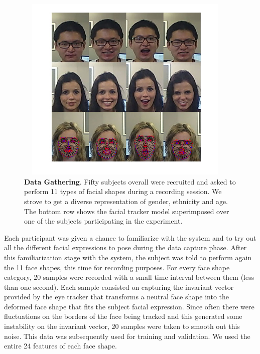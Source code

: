 \documentclass[]{article}
\begin{document}
\begin{figure}[ht]
\begin{center}
\vspace{-3mm}
\includegraphics[width=0.95\textwidth,height=90mm]{figures/dataExtrationExamples.jpg}
\end{center}
\caption{\textbf{Data Gathering}. Fifty subjects overall were recruited and asked to perform 11 types of facial shapes during a 
recording session. We strove to  get a diverse representation of gender, ethnicity and age. The bottom row shows the facial tracker 
model superimposed over one of the subjects participating in the experiment.}
\label{dataExtrationExamples}
\end{figure}


Each participant was given a chance to familiarize with the system and to try out all the different facial expressions
to pose during the data capture phase. After this familiarization stage with the system, the subject was told to perform
again the 11 face shapes, this time for recording purposes. For every face shape category, 20 samples were recorded with
a small time interval between them (less than one second). Each sample consisted on capturing the invariant vector
provided by the eye tracker that transforms a neutral face shape into the deformed face shape that fits the subject
facial expression. Since often there were fluctuations on the borders of the face being tracked and this generated some
instability on the invariant vector, 20 samples were taken to smooth out this noise. This data was subsequently
used for training and validation. We used the entire 24 features of each face shape. 
\end{document}
